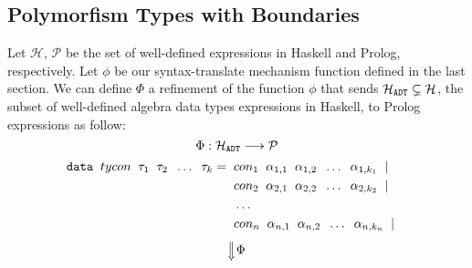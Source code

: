 	\subsection{Polymorfism Types with Boundaries}
	Let $\mathcal{H}$, $\mathcal{P}$ be the set of well-defined expressions in Haskell and Prolog, respectively. Let $\phi$ be our syntax-translate mechanism function defined in the last section. We can define $\Phi$ a refinement of the function $\phi$ that sends $\mathcal{H}_{\texttt{ADT}} \subsetneq \mathcal{H}$, the subset of well-defined algebra data types expressions in Haskell, to Prolog expressions as follow: $$\Phi: \mathcal{H}_{\texttt{ADT}} \longrightarrow \mathcal{P} $$
	\begin{align*}
		\texttt{data} \;\; tycon \;\; \tau_1 \;\; \tau_2 \;\; \ldots \;\; \tau_k 	= & \;\; con_1 \;\; \alpha_{1,1} \;\; \alpha_{1,2} \;\; \ldots \;\; \alpha_{1,k_1} \;\; | &   &   \\
		                                                                         & \;\; con_2 \;\; \alpha_{2,1} \;\; \alpha_{2,2} \;\; \ldots \;\; \alpha_{2,k_2} \;\; | &   &   \\
		                                                                         & \;\; \ldots \;\;                                                                      &   &   \\
		                                                                         & \;\; con_n \;\; \alpha_{n,1} \;\; \alpha_{n,2} \;\; \ldots \;\; \alpha_{n,k_n} \;\; | &   &   \\
	\end{align*}
	$$\SLongdownarrow \Phi$$
